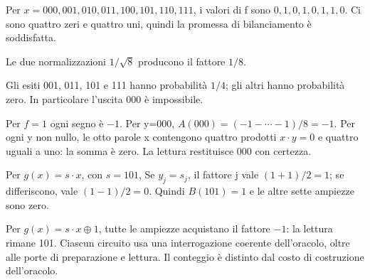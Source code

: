 \ExSolution


Per \(x=000,001,010,011,100,101,110,111\), i valori di f sono \(0,1,0,1,0,1,1,0\). Ci sono quattro zeri e quattro uni, quindi la promessa di bilanciamento è soddisfatta.


Le due normalizzazioni \(1/\sqrt8\) producono il fattore \(1/8\).


Gli esiti 001, 011, 101 e 111 hanno probabilità \(1/4\); gli altri hanno probabilità zero. In particolare l’uscita 000 è impossibile.


Per \(f=1\) ogni segno è \(-1\). Per y=000, \(A(000)=(-1-\cdots-1)/8=-1\). Per ogni y non nullo, le otto parole x contengono quattro prodotti \(x\cdot y=0\) e quattro uguali a uno: la somma è zero. La lettura restituisce 000 con certezza.


Per \(g(x)=s\cdot x\), con \(s=101\),
Se \(y_j=s_j\), il fattore j vale \((1+1)/2=1\); se differiscono, vale \((1-1)/2=0\). Quindi \(B(101)=1\) e le altre sette ampiezze sono zero.


Per \(g(x)=s\cdot x\oplus1\), tutte le ampiezze acquistano il fattore \(-1\): la lettura rimane 101. Ciascun circuito usa una interrogazione coerente dell’oracolo, oltre alle porte di preparazione e lettura. Il conteggio è distinto dal costo di costruzione dell’oracolo.

